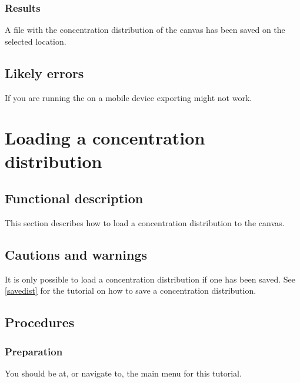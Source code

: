 \subsubsection{Results}
A file with the concentration distribution of the canvas has been saved on the selected location.

\subsection{Likely errors}
If you are running the \applicationname on a mobile device exporting might not work.


\section{Loading a concentration distribution}
\label{sec:loadDist}

\subsection{Functional description}
This section describes how to load a concentration distribution to the canvas.

\subsection{Cautions and warnings}
It is only possible to load a concentration distribution if one has been saved. See \ref{savedist} for the tutorial on how to save a concentration distribution.

\subsection{Procedures}
\subsubsection{Preparation}
You should be at, or navigate to, the main menu for this tutorial.

